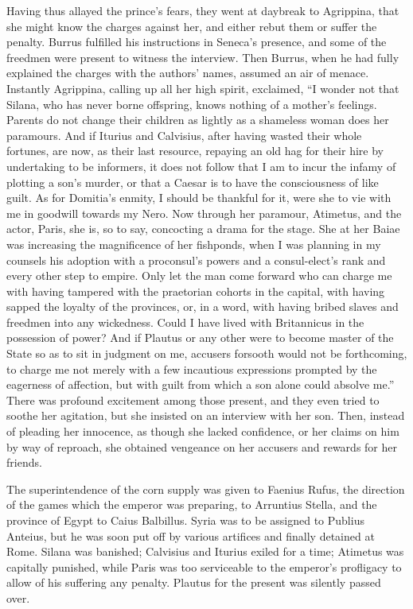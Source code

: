 Having thus allayed the prince's fears, they went at daybreak to Agrippina, that she might know the charges against her, and either rebut them or suffer the penalty. Burrus fulfilled his instructions in Seneca's presence, and some of the freedmen were present to witness the interview. Then Burrus, when he had fully explained the charges with the authors' names, assumed an air of menace. Instantly Agrippina, calling up all her high spirit, exclaimed, ``I wonder not that Silana, who has never borne offspring, knows nothing of a mother's feelings. Parents do not change their children as lightly as a shameless woman does her paramours. And if Iturius and Calvisius, after having wasted their whole fortunes, are now, as their last resource, repaying an old hag for their hire by undertaking to be informers, it does not follow that I am to incur the infamy of plotting a son's murder, or that a Caesar is to have the consciousness of like guilt. As for Domitia's enmity, I should be thankful for it, were she to vie with me in goodwill towards my Nero. Now through her paramour, Atimetus, and the actor, Paris, she is, so to say, concocting a drama for the stage. She at her Baiae was increasing the magnificence of her fishponds, when I was planning in my counsels his adoption with a proconsul's powers and a consul-elect's rank and every other step to empire. Only let the man come forward who can charge me with having tampered with the praetorian cohorts in the capital, with having sapped the loyalty of the provinces, or, in a word, with having bribed slaves and freedmen into any wickedness. Could I have lived with Britannicus in the possession of power? And if Plautus or any other were to become master of the State so as to sit in judgment on me, accusers forsooth would not be forthcoming, to charge me not merely with a few incautious expressions prompted by the eagerness of affection, but with guilt from which a son alone could absolve me.'' There was profound excitement among those present, and they even tried to soothe her agitation, but she insisted on an interview with her son. Then, instead of pleading her innocence, as though she lacked confidence, or her claims on him by way of reproach, she obtained vengeance on her accusers and rewards for her friends.


The superintendence of the corn supply was given to Faenius Rufus, the direction of the games which the emperor was preparing, to Arruntius Stella, and the province of Egypt to Caius Balbillus. Syria was to be assigned to Publius Anteius, but he was soon put off by various artifices and finally detained at Rome. Silana was banished; Calvisius and Iturius exiled for a time; Atimetus was capitally punished, while Paris was too serviceable to the emperor's profligacy to allow of his suffering any penalty. Plautus for the present was silently passed over.

